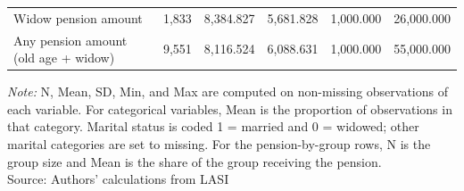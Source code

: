 \begin{table}[H]
{\begin{tabular}{lrrrrr}
Widow pension amount & 1,833 & 8,384.827 & 5,681.828 & 1,000.000 & 26,000.000 \\
Any pension amount (old age + widow) & 9,551 & 8,116.524 & 6,088.631 & 1,000.000 & 55,000.000 \\
\bottomrule
\midrule
\end{tabular}
}
\vspace{2mm}
\begin{minipage}{0.95\textwidth}
\footnotesize \textit{Note:} N, Mean, SD, Min, and Max are computed on non-missing observations of each variable. For categorical variables, Mean is the proportion of observations in that category. Marital status is coded 1 = married and 0 = widowed; other marital categories are set to missing. For the pension-by-group rows, N is the group size and Mean is the share of the group receiving the pension. \\
Source: Authors' calculations from LASI
\end{minipage}
\end{table}
